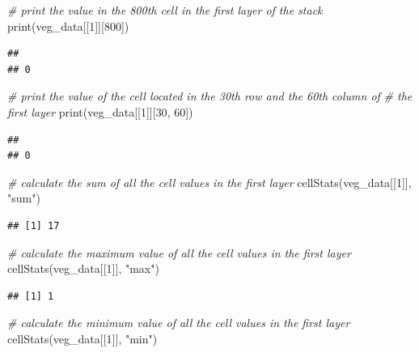\documentclass[
  12pt,
]{book}
\newenvironment{Shaded}{\begin{snugshade}}{\end{snugshade}}
\newcommand{\CommentTok}[1]{\textcolor[rgb]{0.56,0.35,0.01}{\textit{#1}}}
\newcommand{\DecValTok}[1]{\textcolor[rgb]{0.00,0.00,0.81}{#1}}
\newcommand{\FunctionTok}[1]{\textcolor[rgb]{0.00,0.00,0.00}{#1}}
\newcommand{\NormalTok}[1]{#1}
\newcommand{\StringTok}[1]{\textcolor[rgb]{0.31,0.60,0.02}{#1}}
\begin{document}
\begin{Shaded}
\begin{Highlighting}[]
\CommentTok{\# print the value in the 800th cell in the first layer of the stack}
\FunctionTok{print}\NormalTok{(veg\_data[[}\DecValTok{1}\NormalTok{]][}\DecValTok{800}\NormalTok{])}
\end{Highlighting}
\end{Shaded}

\begin{verbatim}
##   
## 0
\end{verbatim}

\begin{Shaded}
\begin{Highlighting}[]
\CommentTok{\# print the value of the cell located in the 30th row and the 60th column of}
\CommentTok{\# the first layer}
\FunctionTok{print}\NormalTok{(veg\_data[[}\DecValTok{1}\NormalTok{]][}\DecValTok{30}\NormalTok{, }\DecValTok{60}\NormalTok{])}
\end{Highlighting}
\end{Shaded}

\begin{verbatim}
##   
## 0
\end{verbatim}

\begin{Shaded}
\begin{Highlighting}[]
\CommentTok{\# calculate the sum of all the cell values in the first layer}
\FunctionTok{cellStats}\NormalTok{(veg\_data[[}\DecValTok{1}\NormalTok{]], }\StringTok{"sum"}\NormalTok{)}
\end{Highlighting}
\end{Shaded}

\begin{verbatim}
## [1] 17
\end{verbatim}

\begin{Shaded}
\begin{Highlighting}[]
\CommentTok{\# calculate the maximum value of all the cell values in the first layer}
\FunctionTok{cellStats}\NormalTok{(veg\_data[[}\DecValTok{1}\NormalTok{]], }\StringTok{"max"}\NormalTok{)}
\end{Highlighting}
\end{Shaded}

\begin{verbatim}
## [1] 1
\end{verbatim}

\begin{Shaded}
\begin{Highlighting}[]
\CommentTok{\# calculate the minimum value of all the cell values in the first layer}
\FunctionTok{cellStats}\NormalTok{(veg\_data[[}\DecValTok{1}\NormalTok{]], }\StringTok{"min"}\NormalTok{)}
\end{Highlighting}
\end{Shaded}
\end{document}
